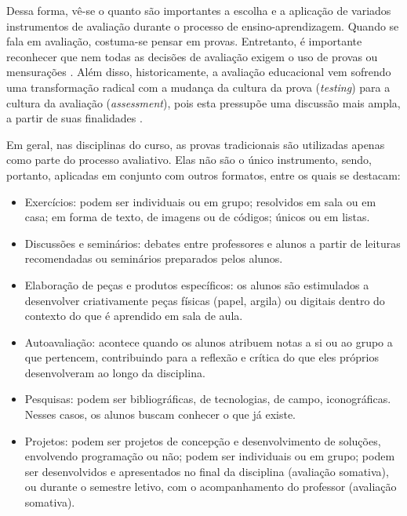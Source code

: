 Dessa forma, vê-se o quanto são importantes a escolha e a aplicação de variados instrumentos de avaliação durante o processo de ensino-aprendizagem. Quando se fala em avaliação, costuma-se pensar em provas. Entretanto, é importante reconhecer que nem todas as decisões de avaliação exigem o uso de provas ou mensurações \cite{russell2014avaliacao}. Além disso, historicamente, a avaliação educacional vem sofrendo uma transformação radical com a mudança da cultura da prova (\textit{testing}) para a cultura da avaliação (\textit{assessment}), pois esta pressupõe uma discussão mais ampla, a partir de suas finalidades \cite{depresbiteris2017diversificar}.

Em geral, nas disciplinas do curso, as provas tradicionais são utilizadas apenas como parte do processo avaliativo. Elas não são o único instrumento, sendo, portanto, aplicadas em conjunto com outros formatos, entre os quais se destacam:
\begin{itemize}
    \item Exercícios: podem ser individuais ou em grupo; resolvidos em sala ou em casa; em forma de texto, de imagens ou de códigos; únicos ou em listas.
    \item Discussões e seminários: debates entre professores e alunos a partir de leituras recomendadas ou seminários preparados pelos alunos.
    \item Elaboração de peças e produtos específicos: os alunos são estimulados a desenvolver criativamente peças físicas (papel, argila) ou digitais dentro do contexto do que é aprendido em sala de aula.
    \item Autoavaliação: acontece quando os alunos atribuem notas a si ou ao grupo a que pertencem, contribuindo para a reflexão e crítica do que eles próprios desenvolveram ao longo da disciplina.
    \item Pesquisas: podem ser bibliográficas, de tecnologias, de campo, iconográficas. Nesses casos, os alunos buscam conhecer o que já existe.
    \item Projetos: podem ser projetos de concepção e desenvolvimento de soluções, envolvendo programação ou não; podem ser individuais ou em grupo; podem ser desenvolvidos e apresentados no final da disciplina (avaliação somativa), ou durante o semestre letivo, com o acompanhamento do professor (avaliação somativa).
\end{itemize}

